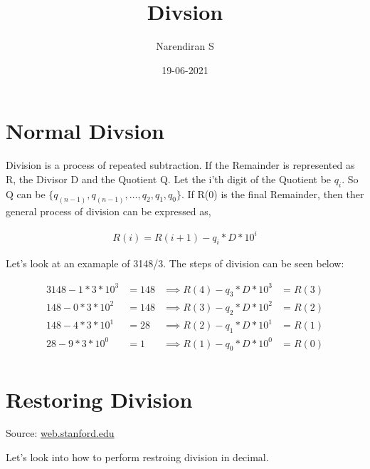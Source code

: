 \documentclass{article}
\title{Divsion}
\author{Narendiran S}
\date{19-06-2021}
\begin{document}
\Large
\maketitle

\section{Normal Divsion}
Division is a process of repeated subtraction.
If the Remainder is represented as R, the Divisor D and the Quotient Q.
Let the i'th digit of the Quotient be $q_i$.
So Q can be $\{ q_(n-1), q_(n-1), \dots, q_2, q_1, q_0 \}$.
If R(0) is the final Remainder, then ther general process of division can be expressed as,

\begin{align*}
    R(i) = R(i + 1) - q_i * D * 10^i
\end{align*}

Let's look at an examaple of 3148/3.
The steps of division can be seen below:

\begin{align*}
    3148 - 1 * 3 * 10^3 & =148  & \implies R(4) - q_3 * D * 10^3 & = R(3) \\
    148 - 0 * 3 * 10^2  & = 148 & \implies R(3) - q_2 * D * 10^2 & = R(2) \\
    148 - 4 * 3 * 10^1  & = 28  & \implies R(2) - q_1 * D * 10^1 & = R(1) \\
    28 - 9 * 3 * 10^0   & = 1   & \implies R(1) - q_0 * D * 10^0 & = R(0) \\
\end{align*}

\section{Restoring Division}

Source: \href{https://web.stanford.edu/class/ee486/doc/chap5.pdf}{web.stanford.edu}

Let's look into how to perform restroing division in decimal.
\end{document}
